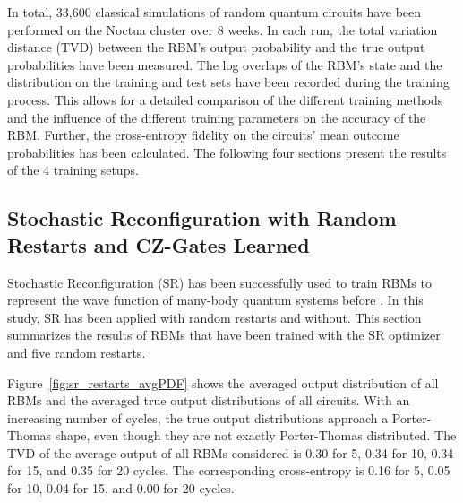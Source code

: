 In total, 33,600 classical simulations of random quantum circuits have been performed 
on the Noctua cluster over 8 weeks. In each run, the total variation distance (TVD)
between the RBM's output probability and the true output probabilities have been measured.
 The log overlaps of the RBM's state and the distribution on the training and test sets have been recorded during the training process. This allows for a detailed comparison
of the different training methods and the influence of the different training parameters on the 
accuracy of the RBM. Further, the cross-entropy fidelity on the circuits' mean outcome probabilities
has been calculated. The following four sections present the results of the 4 training setups.

\subsection{Stochastic Reconfiguration with Random Restarts and CZ-Gates Learned}

Stochastic Reconfiguration (SR) has been successfully used to train RBMs to represent the wave function 
of many-body quantum systems before \cite{}. In this study, SR has been applied with random restarts 
and without. 
This section summarizes the results of RBMs that have been trained with the SR optimizer and five random 
restarts.

Figure~\ref{fig:sr_restarts_avgPDF} shows the averaged output distribution of all RBMs and 
the averaged true output distributions of all circuits. With an increasing number of cycles, the 
true output distributions approach a Porter-Thomas shape, even though they are not exactly Porter-Thomas 
distributed.
The TVD of the average output of all RBMs considered 
is 0.30 for 5, 0.34 for 10, 0.34 for 15, and 0.35 for 20 cycles. The corresponding cross-entropy is 
0.16 for 5, 0.05 for 10, 0.04 for 15, and 0.00 for 20 cycles.


